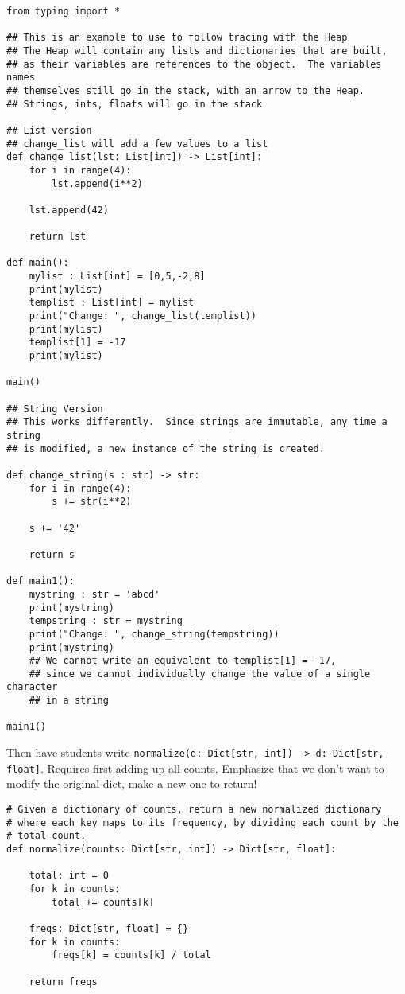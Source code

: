 \documentclass{article}
\begin{document}
\begin{verbatim}
from typing import *

## This is an example to use to follow tracing with the Heap
## The Heap will contain any lists and dictionaries that are built,
## as their variables are references to the object.  The variables names
## themselves still go in the stack, with an arrow to the Heap.
## Strings, ints, floats will go in the stack

## List version
## change_list will add a few values to a list
def change_list(lst: List[int]) -> List[int]:
    for i in range(4):
        lst.append(i**2)

    lst.append(42)

    return lst

def main():
    mylist : List[int] = [0,5,-2,8]
    print(mylist)
    templist : List[int] = mylist
    print("Change: ", change_list(templist))
    print(mylist)
    templist[1] = -17
    print(mylist)

main()

## String Version
## This works differently.  Since strings are immutable, any time a string
## is modified, a new instance of the string is created.

def change_string(s : str) -> str:
    for i in range(4):
        s += str(i**2)

    s += '42'

    return s

def main1():
    mystring : str = 'abcd'
    print(mystring)
    tempstring : str = mystring
    print("Change: ", change_string(tempstring))
    print(mystring)
    ## We cannot write an equivalent to templist[1] = -17,
    ## since we cannot individually change the value of a single character
    ## in a string

main1()
\end{verbatim}

Then have students write
\verb|normalize(d: Dict[str, int]) -> d: Dict[str, float]|.  Requires
first adding up all counts.  Emphasize that we don't want to modify
the original dict, make a new one to return!

\begin{verbatim}
# Given a dictionary of counts, return a new normalized dictionary
# where each key maps to its frequency, by dividing each count by the
# total count.
def normalize(counts: Dict[str, int]) -> Dict[str, float]:

    total: int = 0
    for k in counts:
        total += counts[k]

    freqs: Dict[str, float] = {}
    for k in counts:
        freqs[k] = counts[k] / total

    return freqs
\end{verbatim}
\end{document}
